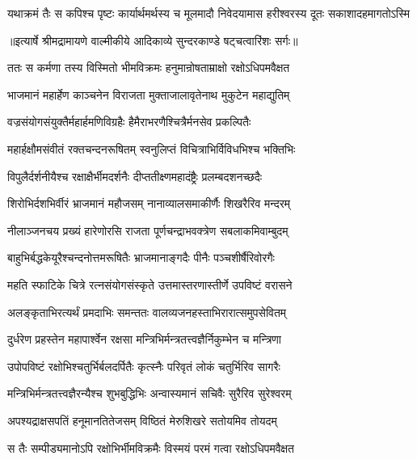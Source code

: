 \fourlineindentedshloka
{यथाक्रमं तैः स कपिश्च पृष्टः}
{कार्यार्थमर्थस्य च मूलमादौ}
{निवेदयामास हरीश्वरस्य}
{दूतः सकाशादहमागतोऽस्मि} %


{॥इत्यार्षे श्रीमद्रामायणे वाल्मीकीये आदिकाव्ये सुन्दरकाण्डे षट्चत्वारिंशः सर्गः॥}


\twolineshloka
{ततः स कर्मणा तस्य विस्मितो भीमविक्रमः}
{हनुमान्रोषताम्राक्षो रक्षोऽधिपमवैक्षत} %

\twolineshloka
{भाजमानं महार्हेण काञ्चनेन विराजता}
{मुक्ताजालावृतेनाथ मुकुटेन महाद्युतिम्} %

\twolineshloka
{वज्रसंयोगसंयुक्तैर्महार्हमणिविग्रहैः}
{हैमैराभरणैश्चित्रैर्मनसेव प्रकल्पितैः} %

\twolineshloka
{महार्हक्षौमसंवीतं रक्तचन्दनरूषितम्}
{स्वनुलिप्तं विचित्राभिर्विविधभिश्च भक्तिभिः} %

\twolineshloka
{विपुलैर्दर्शनीयैश्च रक्षाक्षैर्भीमदर्शनैः}
{दीप्ततीक्ष्णमहादंष्ट्रैः प्रलम्बदशनच्छदैः} %

\twolineshloka
{शिरोभिर्दशभिर्वीरं भ्राजमानं महौजसम्}
{नानाव्यालसमाकीर्णैः शिखरैरिव मन्दरम्} %

\twolineshloka
{नीलाञ्जनचय प्रख्यं हारेणोरसि राजता}
{पूर्णचन्द्राभवक्त्रेण सबलाकमिवाम्बुदम्} %

\twolineshloka
{बाहुभिर्बद्धकेयूरैश्चन्दनोत्तमरूषितैः}
{भ्राजमानाङ्गदैः पीनैः पञ्चशीर्षैरिवोरगैः} %

\twolineshloka
{महति स्फाटिके चित्रे रत्नसंयोगसंस्कृते}
{उत्तमास्तरणास्तीर्णे उपविष्टं वरासने} %

\twolineshloka
{अलङ्कृताभिरत्यर्थं प्रमदाभिः समन्ततः}
{वालव्यजनहस्ताभिरारात्समुपसेवितम्} %

\twolineshloka
{दुर्धरेण प्रहस्तेन महापार्श्वेन रक्षसा}
{मन्त्रिभिर्मन्त्रतत्त्वज्ञैर्निकुम्भेन च मन्त्रिणा} %

\twolineshloka
{उपोपविष्टं रक्षोभिश्चतुर्भिर्बलदर्पितैः}
{कृत्स्नैः परिवृतं लोकं चतुर्भिरिव सागरैः} %

\twolineshloka
{मन्त्रिभिर्मन्त्रतत्त्वज्ञैरन्यैश्च शुभबुद्धिभिः}
{अन्वास्यमानं सचिवैः सुरैरिव सुरेश्वरम्} %

\twolineshloka
{अपश्यद्राक्षसपतिं हनूमानतितेजसम्}
{विष्ठितं मेरुशिखरे सतोयमिव तोयदम्} %

\twolineshloka
{स तैः सम्पीड्यमानोऽपि रक्षोभिर्भीमविक्रमैः}
{विस्मयं परमं गत्वा रक्षोऽधिपमवैक्षत} %

